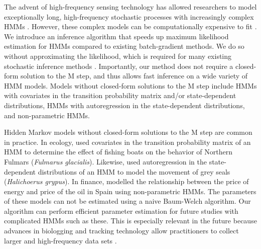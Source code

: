 
The advent of high-frequency sensing technology has allowed researchers to model exceptionally long, high-frequency stochastic processes with increasingly complex HMMs \citep{Patterson:2017}. However, these complex models can be computationally expensive to fit \citep{Glennie:2023}.
We introduce an inference algorithm that speeds up maximum likelihood estimation for HMMs compared to existing batch-gradient methods. We do so without approximating the likelihood, which is required for many existing stochastic inference methods \citep{Gotoh:1998,Ye:2017}. Importantly, our method does not require a closed-form solution to the M step, and thus allows fast inference on a wide variety of HMM models. Models without closed-form solutions to the M step include HMMs with covariates in the transition probability matrix and/or state-dependent distributions, HMMs with autoregression in the state-dependent distributions, and non-parametric HMMs.

Hidden Markov models without closed-form solutions to the M step are common in practice. In ecology, \citet{Pirotta:2018} used covariates in the transition probability matrix of an HMM to determine the effect of fishing boats on the behavior of Northern Fulmars (\textit{Fulmarus glacialis}). Likewise, \citet{Lawler:2019} used autoregression in the state-dependent distributions of an HMM to model the movement of grey seals (\textit{Halichoerus grypus}). In finance, \citet{Langrock:2018} modelled the relationship between the price of energy and price of the oil in Spain using non-parametric HMMs. The parameters of these models can not be estimated using a naive Baum-Welch algorithm. Our algorithm can perform efficient parameter estimation for future studies with complicated HMMs such as these. This is especially relevant in the future because advances in biologging and tracking technology allow practitioners to collect larger and high-frequency data sets \citep{Patterson:2017}.

